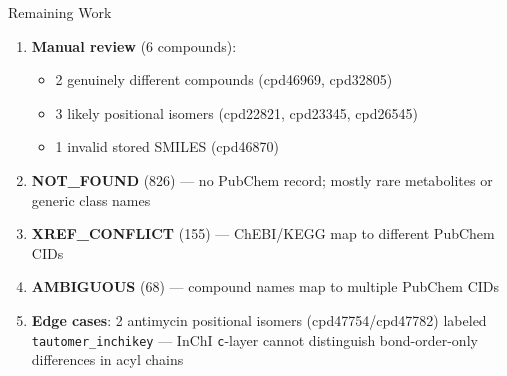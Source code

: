 \documentclass[aspectratio=169,11pt]{beamer}
\begin{document}
\begin{frame}{Remaining Work}

\begin{enumerate}\setlength\itemsep{5pt}
  \item \textbf{Manual review} (6 compounds):
    \begin{itemize}\setlength\itemsep{0pt}\footnotesize
      \item 2 genuinely different compounds (cpd46969, cpd32805)
      \item 3 likely positional isomers (cpd22821, cpd23345, cpd26545)
      \item 1 invalid stored SMILES (cpd46870)
    \end{itemize}

  \item \textbf{NOT\_FOUND} (826) --- no PubChem record;
        mostly rare metabolites or generic class names

  \item \textbf{XREF\_CONFLICT} (155) --- ChEBI/KEGG map to
        different PubChem CIDs

  \item \textbf{AMBIGUOUS} (68) --- compound names map to
        multiple PubChem CIDs

  \item \textbf{Edge cases}: 2 antimycin positional isomers
        (cpd47754/cpd47782) labeled \texttt{tautomer\_inchikey}
        --- InChI \texttt{c}-layer cannot distinguish
        bond-order-only differences in acyl chains
\end{enumerate}

\end{frame}
\end{document}
